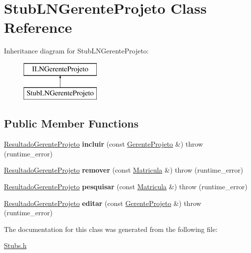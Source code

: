 \hypertarget{class_stub_l_n_gerente_projeto}{}\section{Stub\+L\+N\+Gerente\+Projeto Class Reference}
\label{class_stub_l_n_gerente_projeto}
Inheritance diagram for Stub\+L\+N\+Gerente\+Projeto\+:\begin{figure}[H]
\begin{center}
\leavevmode
\includegraphics[height=2.000000cm]{class_stub_l_n_gerente_projeto}
\end{center}
\end{figure}
\subsection*{Public Member Functions}
\begin{DoxyCompactItemize}
\item 
\hypertarget{class_stub_l_n_gerente_projeto_acad032e088daca7a2dd70c8c54e5a436}{}\label{class_stub_l_n_gerente_projeto_acad032e088daca7a2dd70c8c54e5a436} 
\hyperlink{class_resultado_gerente_projeto}{Resultado\+Gerente\+Projeto} {\bfseries incluir} (const \hyperlink{class_gerente_projeto}{Gerente\+Projeto} \&)  throw (runtime\+\_\+error)
\item 
\hypertarget{class_stub_l_n_gerente_projeto_af23b547480e51c5ee8f9e8d610ece8d1}{}\label{class_stub_l_n_gerente_projeto_af23b547480e51c5ee8f9e8d610ece8d1} 
\hyperlink{class_resultado_gerente_projeto}{Resultado\+Gerente\+Projeto} {\bfseries remover} (const \hyperlink{class_matricula}{Matricula} \&)  throw (runtime\+\_\+error)
\item 
\hypertarget{class_stub_l_n_gerente_projeto_ab199d8c16488b50c0e21d2132a118250}{}\label{class_stub_l_n_gerente_projeto_ab199d8c16488b50c0e21d2132a118250} 
\hyperlink{class_resultado_gerente_projeto}{Resultado\+Gerente\+Projeto} {\bfseries pesquisar} (const \hyperlink{class_matricula}{Matricula} \&)  throw (runtime\+\_\+error)
\item 
\hypertarget{class_stub_l_n_gerente_projeto_a26bc9351a0785670dac4b77b6aa3e9a9}{}\label{class_stub_l_n_gerente_projeto_a26bc9351a0785670dac4b77b6aa3e9a9} 
\hyperlink{class_resultado_gerente_projeto}{Resultado\+Gerente\+Projeto} {\bfseries editar} (const \hyperlink{class_gerente_projeto}{Gerente\+Projeto} \&)  throw (runtime\+\_\+error)
\end{DoxyCompactItemize}


The documentation for this class was generated from the following file\+:\begin{DoxyCompactItemize}
\item 
\hyperlink{_stubs_8h}{Stubs.\+h}\end{DoxyCompactItemize}
